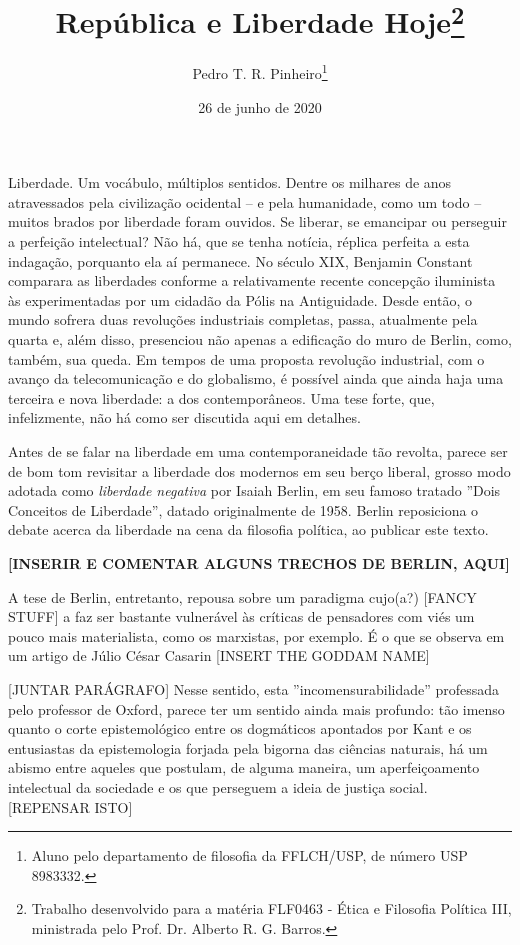 \documentclass[12pt,a4paper]{article}
\author{Pedro T. R. Pinheiro\footnote{Aluno pelo departamento de filosofia 
da FFLCH/USP, de número USP 8983332. }}
\title{República e Liberdade Hoje\footnote{
	Trabalho desenvolvido para a matéria FLF0463 - Ética e Filosofia 
	Política III, ministrada pelo Prof. Dr. Alberto R. G. Barros. }}
\date{26 de junho de 2020}
\begin{document}
	\maketitle
	
	\onehalfspacing
	\setlength{\parskip}{0.5cm}

	Liberdade. Um vocábulo, múltiplos sentidos. Dentre os milhares de anos 
	atravessados pela civilização ocidental -- e pela humanidade, como um 
	todo -- muitos brados por liberdade foram ouvidos. Se liberar, se 
	emancipar ou perseguir a perfeição intelectual? Não há, que se tenha 
	notícia, réplica perfeita a esta indagação, porquanto ela aí permanece. 
	No século XIX, Benjamin Constant comparara as liberdades conforme a 
	relativamente recente concepção iluminista às experimentadas por um 
	cidadão da Pólis na Antiguidade. Desde então, o mundo sofrera duas 
	revoluções industriais completas, passa, atualmente pela quarta e, 
	além disso, presenciou não apenas a edificação do muro de Berlin, como, 
	também, sua queda. Em tempos de uma proposta revolução industrial, 
	com o avanço da telecomunicação e do globalismo, é possível ainda que 
	ainda haja uma terceira e nova liberdade: a dos contemporâneos. 
	Uma tese forte, que, infelizmente, não há como ser discutida aqui 
	em detalhes. 

	Antes de se falar na liberdade em uma contemporaneidade tão revolta, 
	parece ser de bom tom revisitar a liberdade dos modernos em seu berço 
	liberal, grosso modo adotada como \textit{liberdade negativa} por 
	Isaiah Berlin, em seu famoso tratado ”Dois Conceitos de Liberdade”, 
	datado originalmente de 1958. Berlin reposiciona o debate acerca da 
	liberdade na cena da filosofia política, ao publicar este texto. 

	\textbf{[INSERIR E COMENTAR ALGUNS TRECHOS DE BERLIN, AQUI]}

	A tese de Berlin, entretanto, repousa sobre um paradigma cujo(a?)
	[FANCY STUFF] a faz ser bastante vulnerável às críticas de pensadores 
	com viés um pouco mais materialista, como os marxistas, por exemplo. 
	É o que se observa em um artigo de Júlio César Casarin [INSERT THE GODDAM NAME]
	
	[JUNTAR PARÁGRAFO]
	Nesse sentido, esta ”incomensurabilidade” professada pelo professor 
	de Oxford, parece ter um sentido ainda mais profundo: tão imenso  
	quanto o corte epistemológico entre os dogmáticos apontados por Kant 
	e os entusiastas da epistemologia forjada pela bigorna das ciências 
	naturais, há um abismo entre aqueles que postulam, de alguma maneira, 
	um aperfeiçoamento intelectual da sociedade e os que perseguem a ideia 
	de justiça social. [REPENSAR ISTO]
	

	
	
	
\end{document}
